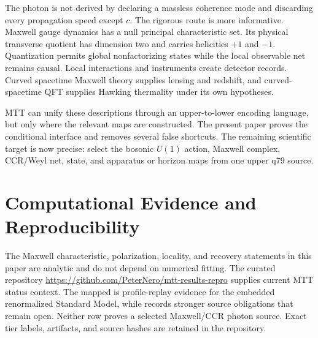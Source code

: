 \documentclass[11pt,a4paper]{article}
\numberwithin{equation}{section}
\theoremstyle{definition}
\theoremstyle{remark}
\begin{document}
The photon is not derived by declaring a massless coherence mode and
discarding every propagation speed except \(c\).  The rigorous route is
more informative.  Maxwell gauge dynamics has a null principal
characteristic set.  Its physical transverse quotient has dimension two
and carries helicities \(+1\) and \(-1\).  Quantization permits global
nonfactorizing states while the local observable net remains causal.
Local interactions and instruments create detector records.  Curved
spacetime Maxwell theory supplies lensing and redshift, and
curved-spacetime QFT supplies Hawking thermality under its own
hypotheses.

MTT can unify these descriptions through an upper-to-lower encoding
language, but only where the relevant maps are constructed.  The present
paper proves the conditional interface and removes several false
shortcuts.  The remaining scientific target is now precise: select the
bosonic \(U(1)\) action, Maxwell complex, CCR/Weyl net, state, and
apparatus or horizon maps from one upper q79 source.

\section*{Computational Evidence and Reproducibility}
The Maxwell characteristic, polarization, locality, and recovery
statements in this paper are analytic and do not depend on numerical
fitting.  The curated repository
\url{https://github.com/PeterNero/mtt-results-repro} supplies current MTT
status context.  The mapped
 is profile-replay evidence for the
embedded renormalized Standard Model, while
 records stronger source obligations that
remain open.  Neither row proves a selected Maxwell/CCR photon source.
Exact tier labels, artifacts, and source hashes are retained in the
repository.



\end{document}
